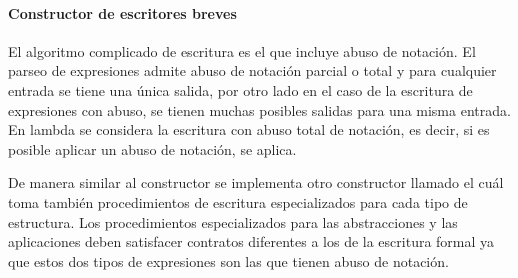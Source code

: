 \documentclass[letterpaper, twoside, openright, 11pt]{book}%
\begin{document}
\paragraph{Constructor de escritores breves} El algoritmo complicado de escritura es el que incluye abuso de notación. El parseo de expresiones admite abuso de notación parcial o total y para cualquier entrada se tiene una única salida, por otro lado en el caso de la escritura de expresiones con abuso, se tienen muchas posibles salidas para una misma entrada. En {\Tt{}lambda\nwendquote} se considera la escritura con abuso total de notación, es decir, si es posible aplicar un abuso de notación, se aplica.

De manera similar al constructor {\Tt{}\nwendquote} se implementa otro constructor llamado {\Tt{}\nwendquote} el cuál toma también procedimientos de escritura especializados para cada tipo de estructura. Los procedimientos especializados para las abstracciones y las aplicaciones deben satisfacer contratos diferentes a los de la escritura formal ya que estos dos tipos de expresiones son las que tienen abuso de notación.
\end{document}
